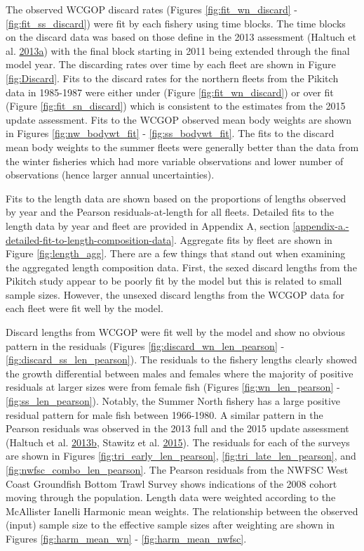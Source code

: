 \documentclass[12pt,]{article}
\begin{document}
The observed WCGOP discard rates (Figures \ref{fig:fit_wn_discard} -
\ref{fig:fit_ss_discard}) were fit by each fishery using time blocks.
The time blocks on the discard data was based on those define in the
2013 assessment (Haltuch et al.
\protect\hyperlink{ref-haltuch_california_2013}{2013}\protect\hyperlink{ref-haltuch_california_2013}{a})
with the final block starting in 2011 being extended through the final
model year. The discarding rates over time by each fleet are shown in
Figure \ref{fig:Discard}. Fits to the discard rates for the northern
fleets from the Pikitch data in 1985-1987 were either under (Figure
\ref{fig:fit_wn_discard}) or over fit (Figure \ref{fig:fit_sn_discard})
which is consistent to the estimates from the 2015 update assessment.
Fits to the WCGOP observed mean body weights are shown in Figures
\ref{fig:nw_bodywt_fit} - \ref{fig:ss_bodywt_fit}. The fits to the
discard mean body weights to the summer fleets were generally better
than the data from the winter fisheries which had more variable
observations and lower number of observations (hence larger annual
uncertainties).

Fits to the length data are shown based on the proportions of lengths
observed by year and the Pearson residuals-at-length for all fleets.
Detailed fits to the length data by year and fleet are provided in
Appendix A, section
\ref{appendix-a.-detailed-fit-to-length-composition-data}. Aggregate
fits by fleet are shown in Figure \ref{fig:length_agg}. There are a few
things that stand out when examining the aggregated length composition
data. First, the sexed discard lengths from the Pikitch study appear to
be poorly fit by the model but this is related to small sample sizes.
However, the unsexed discard lengths from the WCGOP data for each fleet
were fit well by the model.

Discard lengths from WCGOP were fit well by the model and show no
obvious pattern in the residuals (Figures
\ref{fig:discard_wn_len_pearson} - \ref{fig:discard_ss_len_pearson}).
The residuals to the fishery lengths clearly showed the growth
differential between males and females where the majority of positive
residuals at larger sizes were from female fish (Figures
\ref{fig:wn_len_pearson} - \ref{fig:ss_len_pearson}). Notably, the
Summer North fishery has a large positive residual pattern for male fish
between 1966-1980. A similar pattern in the Pearson residuals was
observed in the 2013 full and the 2015 update assessment (Haltuch et al.
\protect\hyperlink{ref-haltuch_status_2013}{2013}\protect\hyperlink{ref-haltuch_status_2013}{b},
Stawitz et al. \protect\hyperlink{ref-stawitz_stock_2015}{2015}). The
residuals for each of the surveys are shown in Figures
\ref{fig:tri_early_len_pearson}, \ref{fig:tri_late_len_pearson}, and
\ref{fig:nwfsc_combo_len_pearson}. The Pearson residuals from the NWFSC
West Coast Groundfish Bottom Trawl Survey shows indications of the 2008
cohort moving through the population. Length data were weighted
according to the McAllister Ianelli Harmonic mean weights. The
relationship between the observed (input) sample size to the effective
sample sizes after weighting are shown in Figures \ref{fig:harm_mean_wn}
- \ref{fig:harm_mean_nwfsc}.
\end{document}
